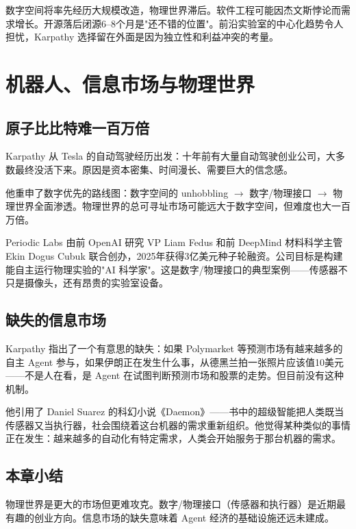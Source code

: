 \documentclass[a4paper]{article}
\begin{document}
数字空间将率先经历大规模改造，物理世界滞后。软件工程可能因杰文斯悖论而需求增长。开源落后闭源6--8个月是"还不错的位置"。前沿实验室的中心化趋势令人担忧，Karpathy 选择留在外面是因为独立性和利益冲突的考量。


\section{机器人、信息市场与物理世界}

\subsection{原子比比特难一百万倍}

Karpathy 从 Tesla 的自动驾驶经历出发：十年前有大量自动驾驶创业公司，大多数最终没活下来。原因是资本密集、时间漫长、需要巨大的信念感。

他重申了数字优先的路线图：数字空间的 unhobbling $\rightarrow$ 数字/物理接口 $\rightarrow$ 物理世界全面渗透。物理世界的总可寻址市场可能远大于数字空间，但难度也大一百万倍。

\begin{knowledgebox}{Periodic Labs}
由前 OpenAI 研究 VP Liam Fedus 和前 DeepMind 材料科学主管 Ekin Dogus Cubuk 联合创办，2025年获得3亿美元种子轮融资。公司目标是构建能自主运行物理实验的"AI 科学家"。这是数字/物理接口的典型案例——传感器不只是摄像头，还有昂贵的实验室设备。
\end{knowledgebox}

\subsection{缺失的信息市场}

Karpathy 指出了一个有意思的缺失：如果 Polymarket 等预测市场有越来越多的自主 Agent 参与，如果伊朗正在发生什么事，从德黑兰拍一张照片应该值10美元——不是人在看，是 Agent 在试图判断预测市场和股票的走势。但目前没有这种机制。

他引用了 Daniel Suarez 的科幻小说《Daemon》——书中的超级智能把人类既当传感器又当执行器，社会围绕着这台机器的需求重新组织。他觉得某种类似的事情正在发生：越来越多的自动化有特定需求，人类会开始服务于那台机器的需求。

\subsection{本章小结}

物理世界是更大的市场但更难攻克。数字/物理接口（传感器和执行器）是近期最有趣的创业方向。信息市场的缺失意味着 Agent 经济的基础设施还远未建成。
\end{document}
